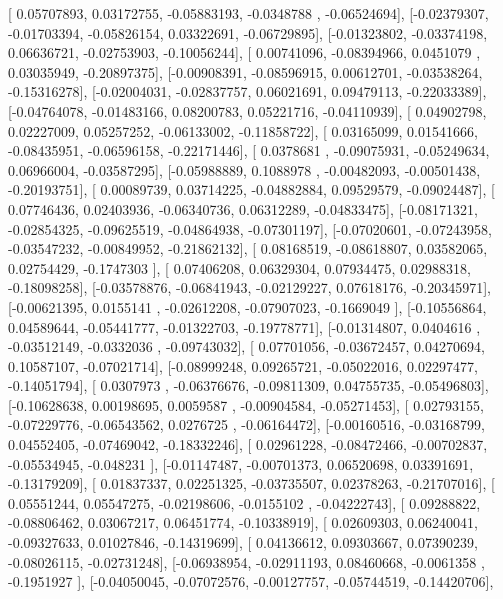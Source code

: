 \documentclass{article}
\begin{document}
       [ 0.05707893,  0.03172755, -0.05883193, -0.0348788 , -0.06524694],
       [-0.02379307, -0.01703394, -0.05826154,  0.03322691, -0.06729895],
       [-0.01323802, -0.03374198,  0.06636721, -0.02753903, -0.10056244],
       [ 0.00741096, -0.08394966,  0.0451079 ,  0.03035949, -0.20897375],
       [-0.00908391, -0.08596915,  0.00612701, -0.03538264, -0.15316278],
       [-0.02004031, -0.02837757,  0.06021691,  0.09479113, -0.22033389],
       [-0.04764078, -0.01483166,  0.08200783,  0.05221716, -0.04110939],
       [ 0.04902798,  0.02227009,  0.05257252, -0.06133002, -0.11858722],
       [ 0.03165099,  0.01541666, -0.08435951, -0.06596158, -0.22171446],
       [ 0.0378681 , -0.09075931, -0.05249634,  0.06966004, -0.03587295],
       [-0.05988889,  0.1088978 , -0.00482093, -0.00501438, -0.20193751],
       [ 0.00089739,  0.03714225, -0.04882884,  0.09529579, -0.09024487],
       [ 0.07746436,  0.02403936, -0.06340736,  0.06312289, -0.04833475],
       [-0.08171321, -0.02854325, -0.09625519, -0.04864938, -0.07301197],
       [-0.07020601, -0.07243958, -0.03547232, -0.00849952, -0.21862132],
       [ 0.08168519, -0.08618807,  0.03582065,  0.02754429, -0.1747303 ],
       [ 0.07406208,  0.06329304,  0.07934475,  0.02988318, -0.18098258],
       [-0.03578876, -0.06841943, -0.02129227,  0.07618176, -0.20345971],
       [-0.00621395,  0.0155141 , -0.02612208, -0.07907023, -0.1669049 ],
       [-0.10556864,  0.04589644, -0.05441777, -0.01322703, -0.19778771],
       [-0.01314807,  0.0404616 , -0.03512149, -0.0332036 , -0.09743032],
       [ 0.07701056, -0.03672457,  0.04270694,  0.10587107, -0.07021714],
       [-0.08999248,  0.09265721, -0.05022016,  0.02297477, -0.14051794],
       [ 0.0307973 , -0.06376676, -0.09811309,  0.04755735, -0.05496803],
       [-0.10628638,  0.00198695,  0.0059587 , -0.00904584, -0.05271453],
       [ 0.02793155, -0.07229776, -0.06543562,  0.0276725 , -0.06164472],
       [-0.00160516, -0.03168799,  0.04552405, -0.07469042, -0.18332246],
       [ 0.02961228, -0.08472466, -0.00702837, -0.05534945, -0.048231  ],
       [-0.01147487, -0.00701373,  0.06520698,  0.03391691, -0.13179209],
       [ 0.01837337,  0.02251325, -0.03735507,  0.02378263, -0.21707016],
       [ 0.05551244,  0.05547275, -0.02198606, -0.0155102 , -0.04222743],
       [ 0.09288822, -0.08806462,  0.03067217,  0.06451774, -0.10338919],
       [ 0.02609303,  0.06240041, -0.09327633,  0.01027846, -0.14319699],
       [ 0.04136612,  0.09303667,  0.07390239, -0.08026115, -0.02731248],
       [-0.06938954, -0.02911193,  0.08460668, -0.0061358 , -0.1951927 ],
       [-0.04050045, -0.07072576, -0.00127757, -0.05744519, -0.14420706],
\end{document}
